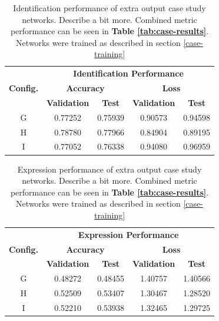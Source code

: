 \begin{table}[h!]
\begin{center}
\begin{tabular}{|c|c|c|c|c|}
\hline
\multirow{3}{*}{\textbf{Config.}} & \multicolumn{4}{|c|}{\textbf{Identification Performance}} \\ \cline{2-5}
& \multicolumn{2}{|c|}{\textbf{Accuracy}} & \multicolumn{2}{|c|}{\textbf{Loss}} \\ \cline{2-5}
& \textbf{Validation} & \textbf{Test} & \textbf{Validation} & \textbf{Test} \\ \hline
G & 0.77252 & 0.75939 & 0.90573 & 0.94598 \\ \hline
H & 0.78780 & 0.77966 & 0.84904 & 0.89195 \\ \hline
I & 0.77052 & 0.76338 & 0.94080 & 0.96959 \\ \hline
\end{tabular}
\end{center}
\caption[Identification performance of extra output case study networks]{Identification performance of extra output case study networks. Describe a bit more. Combined metric performance can be seen in \textbf{Table \ref{tab:case-results}}. Networks were trained as described in section \ref{case-training}}
\label{tab:case-results-id}
\end{table}


\begin{table}[h!]
\begin{center}
\begin{tabular}{|c|c|c|c|c|}
\hline
\multirow{3}{*}{\textbf{Config.}} & \multicolumn{4}{|c|}{\textbf{Expression Performance}} \\ \cline{2-5}
& \multicolumn{2}{|c|}{\textbf{Accuracy}} & \multicolumn{2}{|c|}{\textbf{Loss}} \\ \cline{2-5}
& \textbf{Validation} & \textbf{Test} & \textbf{Validation} & \textbf{Test} \\ \hline
G & 0.48272 & 0.48455 & 1.40757 & 1.40566 \\ \hline
H & 0.52509 & 0.53407 & 1.30467 & 1.28520 \\ \hline
I & 0.52210 & 0.53938 & 1.32465 & 1.29725 \\ \hline
\end{tabular}
\end{center}
\caption[Expression performance of extra output case study networks]{Expression performance of extra output case study networks. Describe a bit more. Combined metric performance can be seen in \textbf{Table \ref{tab:case-results}}. Networks were trained as described in section \ref{case-training}}
\label{tab:case-results-exp}
\end{table}

